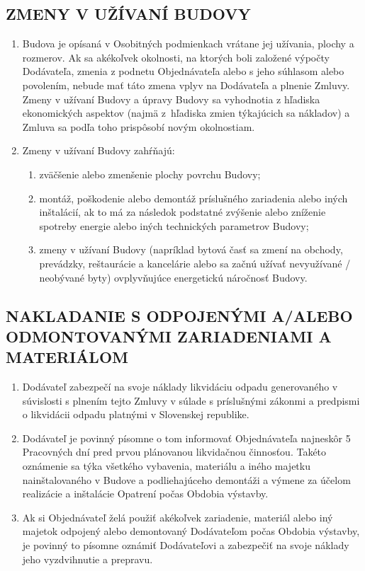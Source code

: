 \begin{multicols}{2}
\subsection{ZMENY V UŽÍVANÍ BUDOVY}

\begin{enumerate}
\def\labelenumi{\arabic{enumi}.}
\item
  Budova je opísaná v Osobitných podmienkach vrátane jej užívania,
  plochy a rozmerov. Ak sa akékoľvek okolnosti, na ktorých boli založené
  výpočty Dodávateľa, zmenia z podnetu Objednávateľa alebo s jeho
  súhlasom alebo povolením, nebude mať táto zmena vplyv na Dodávateľa a
  plnenie Zmluvy. Zmeny v užívaní Budovy a úpravy Budovy sa vyhodnotia z
  hľadiska ekonomických aspektov (najmä z~hľadiska zmien týkajúcich sa
  nákladov) a Zmluva sa podľa toho prispôsobí novým okolnostiam.
\item
  Zmeny v užívaní Budovy zahŕňajú:

  \begin{enumerate}
  \def\labelenumii{\arabic{enumii}.}
  \item
    zväčšenie alebo zmenšenie plochy povrchu Budovy;
  \item
    montáž, poškodenie alebo demontáž príslušného zariadenia alebo iných
    inštalácií, ak to má za následok podstatné zvýšenie alebo zníženie
    spotreby energie alebo iných technických parametrov Budovy;
  \item
    zmeny v užívaní Budovy (napríklad bytová časť sa zmení na obchody,
    prevádzky, reštaurácie a kancelárie alebo sa začnú užívať
    nevyužívané / neobývané byty) ovplyvňujúce energetickú náročnosť
    Budovy.
  \end{enumerate}
\end{enumerate}

\subsection{NAKLADANIE S ODPOJENÝMI A/ALEBO ODMONTOVANÝMI ZARIADENIAMI A MATERIÁLOM}

\begin{enumerate}
\def\labelenumi{\arabic{enumi}.}
\item
  Dodávateľ zabezpečí na svoje náklady likvidáciu odpadu generovaného v
  súvislosti s plnením tejto Zmluvy v súlade s príslušnými zákonmi a
  predpismi o likvidácii odpadu platnými v Slovenskej republike.
\item
  Dodávateľ je povinný písomne o tom informovať Objednávateľa najneskôr
  5 Pracovných dní pred prvou plánovanou likvidačnou činnosťou. Takéto
  oznámenie sa týka všetkého vybavenia, materiálu a iného majetku
  nainštalovaného v Budove a podliehajúceho demontáži a výmene za účelom
  realizácie a inštalácie Opatrení počas Obdobia výstavby.
\item
  Ak si Objednávateľ želá použiť akékoľvek zariadenie, materiál alebo
  iný majetok odpojený alebo demontovaný Dodávateľom počas Obdobia
  výstavby, je povinný to písomne oznámiť Dodávateľovi a zabezpečiť na
  svoje náklady jeho vyzdvihnutie a prepravu.
\end{enumerate}


\end{multicols}
